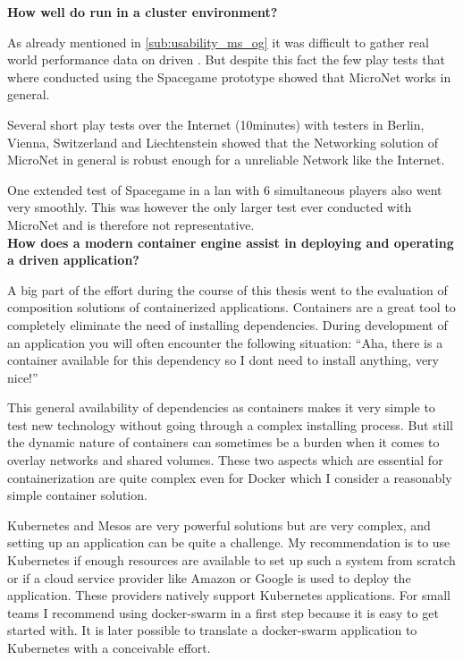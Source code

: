\noindent
\textbf{How well do \ogs{} run in a cluster environment?}

As already mentioned in \autoref{sub:usability_ms_og} it was difficult to
gather real world performance data on \ms{} driven \ogs{}. But despite this fact
the few play tests that where conducted using the Spacegame prototype showed that
MicroNet works in general.

Several short play tests over the Internet (10minutes) with testers in Berlin,
Vienna, Switzerland and Liechtenstein showed that the Networking solution of
MicroNet in general is robust enough for a unreliable Network like the Internet.

One extended test of Spacegame in a \gls{lan} with 6 simultaneous players also
went very smoothly. This was however the only larger test ever conducted with
MicroNet and is therefore not representative.\\

\noindent
\textbf{How does a modern container engine assist in deploying and operating a
\ms{} driven application?}

A big part of the effort during the course of this thesis went to the evaluation
of composition solutions of containerized applications. Containers are a great
tool to completely eliminate the need of installing dependencies. During
development of an application you will often encounter the following situation:
``Aha, there is a container available for this dependency so I dont need to
install anything, very nice!''

This general availability of dependencies as containers makes it very simple to
test new technology without going through a complex installing process. But
still the dynamic nature of containers can sometimes be a burden when it comes
to overlay networks and shared volumes. These two aspects which are essential
for containerization are quite complex even for Docker which I consider a
reasonably simple container solution.

Kubernetes and Mesos are very powerful solutions but are very complex,
and setting up an application can be quite a challenge. My recommendation is
to use Kubernetes if enough resources are available to set up such a system from
scratch or if a cloud service provider like Amazon or Google is used to deploy
the application. These providers natively support Kubernetes applications. For
small teams I recommend using docker-swarm in a first step because it is easy
to get started with. It is later possible to translate a docker-swarm
application to Kubernetes with a conceivable effort.\\

